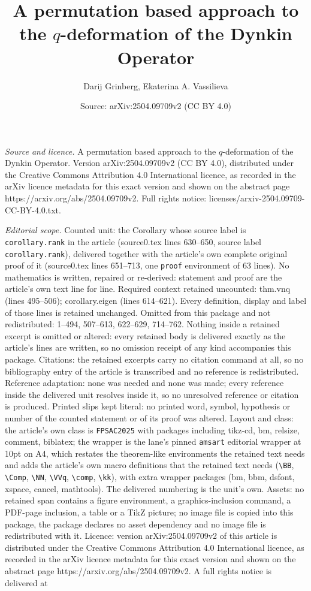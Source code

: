\documentclass[10pt,a4paper]{amsart}
\title[A permutation based approach to the $q$-deformation of the D]{A permutation based approach to the $q$-deformation of the Dynkin Operator}
\author{Darij Grinberg, Ekaterina A. Vassilieva}
\date{Source: arXiv:2504.09709v2 (CC BY 4.0)}
\begin{document}
\maketitle

\noindent\emph{Source and licence.} A permutation based approach to the $q$-deformation of the Dynkin Operator. Version arXiv:2504.09709v2 (CC BY 4.0), distributed under the Creative Commons Attribution 4.0 International licence, as recorded in the arXiv licence metadata for this exact version and shown on the abstract page https://arxiv.org/abs/2504.09709v2. Full rights notice: licenses/arxiv-2504.09709-CC-BY-4.0.txt.\par\smallskip

\noindent\textit{Editorial scope.} Counted unit: the Corollary whose source label is \texttt{corollary.rank} in the article (source0.tex lines 630--650, source label \texttt{corollary.rank}), delivered together with the article's own complete original proof of it (source0.tex lines 651--713, one \texttt{proof} environment of 63 lines). No mathematics is written, repaired or re-derived: statement and proof are the article's own text line for line. Required context retained uncounted: thm.vnq (lines 495--506); corollary.eigen (lines 614--621). Every definition, display and label of those lines is retained unchanged. Omitted from this package and not redistributed: 1--494, 507--613, 622--629, 714--762. Nothing inside a retained excerpt is omitted or altered: every retained body is delivered exactly as the article's lines are written, so no omission receipt of any kind accompanies this package. Citations: the retained excerpts carry no citation command at all, so no bibliography entry of the article is transcribed and no reference is redistributed. Reference adaptation: none was needed and none was made; every reference inside the delivered unit resolves inside it, so no unresolved reference or citation is produced. Printed slips kept literal: no printed word, symbol, hypothesis or number of the counted statement or of its proof was altered. Layout and class: the article's own class is \texttt{FPSAC2025} with packages including tikz-cd, bm, relsize, comment, biblatex; the wrapper is the lane's pinned \texttt{amsart} editorial wrapper at 10pt on A4, which restates the theorem-like environments the retained text needs and adds the article's own macro definitions that the retained text needs (\texttt{\textbackslash BB}, \texttt{\textbackslash Comp}, \texttt{\textbackslash NN}, \texttt{\textbackslash VVq}, \texttt{\textbackslash comp}, \texttt{\textbackslash kk}), with extra wrapper packages (bm, bbm, dsfont, xspace, cancel, mathtools). The delivered numbering is the unit's own. Assets: no retained span contains a figure environment, a graphics-inclusion command, a PDF-page inclusion, a table or a TikZ picture; no image file is copied into this package, the package declares no asset dependency and no image file is redistributed with it. Licence: version arXiv:2504.09709v2 of this article is distributed under the Creative Commons Attribution 4.0 International licence, as recorded in the arXiv licence metadata for this exact version and shown on the abstract page https://arxiv.org/abs/2504.09709v2. A full rights notice is delivered at 
\end{document}
